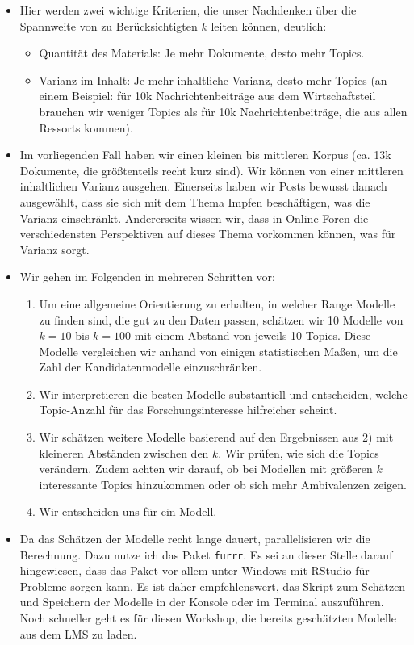 \documentclass[
]{book}
\providecommand{\tightlist}{%
  \setlength{\itemsep}{0pt}\setlength{\parskip}{0pt}}
\begin{document}
\begin{itemize}
\tightlist
\item
  Hier werden zwei wichtige Kriterien, die unser Nachdenken über die Spannweite von zu Berücksichtigten \(k\) leiten können, deutlich:

  \begin{itemize}
  \tightlist
  \item
    Quantität des Materials: Je mehr Dokumente, desto mehr Topics.
  \item
    Varianz im Inhalt: Je mehr inhaltliche Varianz, desto mehr Topics (an einem Beispiel: für 10k Nachrichtenbeiträge aus dem Wirtschaftsteil brauchen wir weniger Topics als für 10k Nachrichtenbeiträge, die aus allen Ressorts kommen).
  \end{itemize}
\item
  Im vorliegenden Fall haben wir einen kleinen bis mittleren Korpus (ca. 13k Dokumente, die größtenteils recht kurz sind). Wir können von einer mittleren inhaltlichen Varianz ausgehen. Einerseits haben wir Posts bewusst danach ausgewählt, dass sie sich mit dem Thema Impfen beschäftigen, was die Varianz einschränkt. Andererseits wissen wir, dass in Online-Foren die verschiedensten Perspektiven auf dieses Thema vorkommen können, was für Varianz sorgt.
\item
  Wir gehen im Folgenden in mehreren Schritten vor:

  \begin{enumerate}
  \def\labelenumi{\arabic{enumi})}
  \tightlist
  \item
    Um eine allgemeine Orientierung zu erhalten, in welcher Range Modelle zu finden sind, die gut zu den Daten passen, schätzen wir 10 Modelle von \(k = 10\) bis \(k = 100\) mit einem Abstand von jeweils 10 Topics. Diese Modelle vergleichen wir anhand von einigen statistischen Maßen, um die Zahl der Kandidatenmodelle einzuschränken.
  \item
    Wir interpretieren die besten Modelle substantiell und entscheiden, welche Topic-Anzahl für das Forschungsinteresse hilfreicher scheint.
  \item
    Wir schätzen weitere Modelle basierend auf den Ergebnissen aus 2) mit kleineren Abständen zwischen den \(k\). Wir prüfen, wie sich die Topics verändern. Zudem achten wir darauf, ob bei Modellen mit größeren \(k\) interessante Topics hinzukommen oder ob sich mehr Ambivalenzen zeigen.
  \item
    Wir entscheiden uns für ein Modell.
  \end{enumerate}
\item
  Da das Schätzen der Modelle recht lange dauert, parallelisieren wir die Berechnung. Dazu nutze ich das Paket \texttt{furrr}. Es sei an dieser Stelle darauf hingewiesen, dass das Paket vor allem unter Windows mit RStudio für Probleme sorgen kann. Es ist daher empfehlenswert, das Skript zum Schätzen und Speichern der Modelle in der Konsole oder im Terminal auszuführen. Noch schneller geht es für diesen Workshop, die bereits geschätzten Modelle aus dem LMS zu laden.
\end{itemize}
\end{document}
